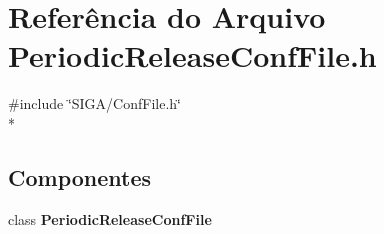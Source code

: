 \section{Referência do Arquivo Periodic\+Release\+Conf\+File.\+h}
\label{_periodic_release_conf_file_8h}
{\ttfamily \#include \char`\"{}S\+I\+G\+A/\+Conf\+File.\+h\char`\"{}}\\*
\subsection*{Componentes}
\begin{DoxyCompactItemize}
\item 
class {\bf Periodic\+Release\+Conf\+File}
\end{DoxyCompactItemize}
